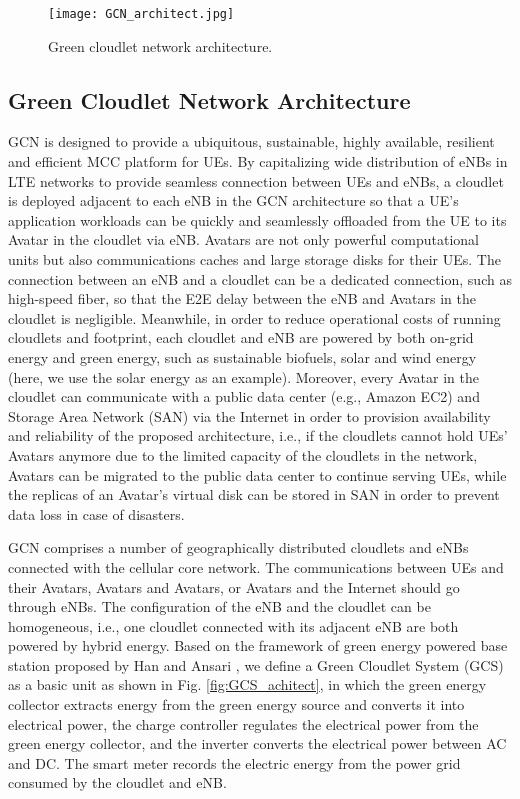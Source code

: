 \documentclass[journal,12pt,draftclsnofoot,onecolumn]{IEEEtran}
\begin{document}
\begin{figure*}[!h]
\begin{minipage}[t]{1\linewidth}
	\centering	
	\texttt{[image: GCN\_architect.jpg]}
	\caption{Green cloudlet network architecture.}	
	\label{fig:GCN_architect}
\end{minipage}
\end{figure*}

\subsection{Green Cloudlet Network Architecture}
GCN is designed to provide a ubiquitous, sustainable, highly available, resilient and efficient MCC platform for UEs. By capitalizing wide distribution of eNBs in LTE networks to provide seamless connection between UEs and eNBs, a cloudlet is deployed adjacent to each eNB in the GCN architecture so that a UE's application workloads can be quickly and seamlessly offloaded from the UE to its Avatar in the cloudlet via eNB. Avatars are not only powerful computational units but also communications caches and large storage disks for their UEs. The connection between an eNB and a cloudlet can be a dedicated connection, such as high-speed fiber, so that the E2E delay between the eNB and Avatars in the cloudlet is negligible. Meanwhile, in order to reduce operational costs of running cloudlets and  footprint, each cloudlet and eNB are powered by both on-grid energy and green energy, such as sustainable biofuels, solar and wind energy (here, we use the solar energy as an example). Moreover, every Avatar in the cloudlet can communicate with a public data center (e.g., Amazon EC2) and Storage Area Network (SAN) via the Internet in order to provision availability and reliability of the proposed architecture, i.e., if the cloudlets cannot hold UEs' Avatars anymore due to the limited capacity of the cloudlets in the network, Avatars can be migrated to the public data center to continue serving UEs, while the replicas of an Avatar's virtual disk can be stored in SAN in order to prevent data loss in case of disasters.

GCN comprises a number of geographically distributed cloudlets and eNBs connected with the cellular core network. The communications between UEs and their Avatars, Avatars and Avatars, or Avatars and the Internet should go through eNBs. The configuration of the eNB and the cloudlet can be homogeneous, i.e., one cloudlet connected with its adjacent eNB are both powered by hybrid energy. Based on the framework of green energy powered base station proposed by Han and Ansari \cite{4}, we define a Green Cloudlet System (GCS) as a basic unit as shown in Fig. \ref{fig:GCS_achitect}, in which the green energy collector extracts energy from the green energy source and converts it into electrical power, the charge controller regulates the electrical power from the green energy collector, and the inverter converts the electrical power between AC and DC. The smart meter records the electric energy from the power grid consumed by the cloudlet and eNB.
\end{document}
